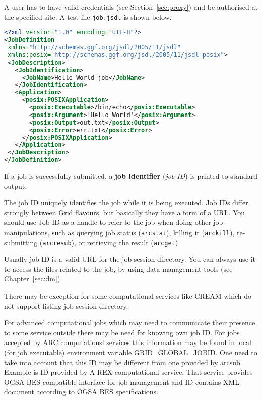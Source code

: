 A user has to have valid credentials (see Section~\ref{sec:proxy}) and be authorised at the specified site. A test file \texttt{job.jsdl} is shown below.

\begin{lstlisting}[language=xml]
<?xml version="1.0" encoding="UTF-8"?>
<JobDefinition
 xmlns="http://schemas.ggf.org/jsdl/2005/11/jsdl"
 xmlns:posix="http://schemas.ggf.org/jsdl/2005/11/jsdl-posix">
 <JobDescription>
   <JobIdentification>
     <JobName>Hello World job</JobName>
   </JobIdentification>
   <Application>
     <posix:POSIXApplication>
       <posix:Executable>/bin/echo</posix:Executable>
       <posix:Argument>'Hello World'</posix:Argument>
       <posix:Output>out.txt</posix:Output>
       <posix:Error>err.txt</posix:Error>
     </posix:POSIXApplication>
   </Application>
 </JobDescription>
</JobDefinition>
\end{lstlisting}

\begin{framed}
   If a job is successfully submitted, a \textbf{job identifier}
   (\textit{job ID}) is printed to standard output.
\end{framed}

The job ID uniquely identifies the job while it is being executed. Job IDs
differ strongly between Grid flavours, but basically they have a form of a URL.
You should use Job ID as a handle to refer to the job when doing other
job manipulations, such as querying job status (\verb#arcstat#),
killing it (\verb#arckill#), re-submitting (\verb#arcresub#), or
retrieving the result (\verb#arcget#).

\begin{framed}
   Usually job ID is a valid URL for the job session directory. You can
   always use it to access the files related to the job, by using data
   management tools (see Chapter~\ref{sec:dm}).

   There may be exception for some computational services like CREAM 
   which do not support listing job session directory.
\end{framed}

\begin{framed}
   For advanced computational jobs which may need to communicate their 
   presence to some service outside there may be need for knowing own
   job ID. For jobs accepted by ARC computationsl services this information
   may be found in local (for job executable) environment variable 
   GRID\_GLOBAL\_JOBID. One need to take into account that this ID may be 
   different from one provided by arcsub. Example is ID provided by
   A-REX computational service. That service provides OGSA BES 
   compatible interface for job management and ID contains XML document
   according to OGSA BES specifications.
\end{framed}

